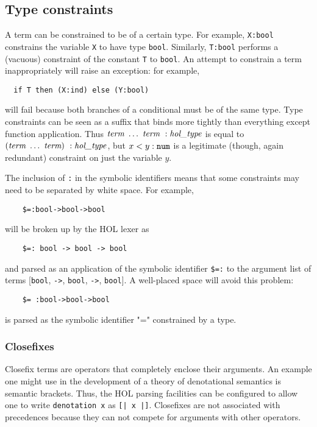 {\subsection{Type constraints}

A term can be constrained to be of a certain type.  For example,
\verb+X:bool+ constrains the variable \verb+X+ to have type
\verb+bool+. Similarly, \verb+T:bool+ performs a (vacuous) constraint
of the constant \verb+T+ to \verb+bool+. An attempt to constrain a
term inappropriately will raise an exception: for example,
\begin{verbatim}
  if T then (X:ind) else (Y:bool)
\end{verbatim}
will fail because both branches of a conditional must be of the same
type.  Type constraints can be seen as a suffix that binds more
tightly than everything except function application.  Thus $\mbox{\it term}\
\ldots\ \mbox{\it term} \ : \mbox{\it hol\_type}$ is equal to $(\mbox{\it term}\ \ldots\ \mbox{\it term})\ :
\mbox{\it hol\_type}$, but $x < y:\mbox{\tt num}$ is a legitimate (though, again
redundant) constraint on just the variable $y$.

The inclusion of \verb+:+ in the symbolic identifiers means that some
constraints may need to be separated by white space. For example,
\begin{verbatim}
    $=:bool->bool->bool
\end{verbatim}
will be broken up by the HOL lexer as
\begin{verbatim}
    $=: bool -> bool -> bool
\end{verbatim}
and parsed as an application of the symbolic identifier \verb+$=:+ to
the argument list of terms [\verb+bool+, \verb+->+, \verb+bool+,
\verb+->+, \verb+bool+]. A well-placed space will avoid this problem:
\begin{verbatim}
    $= :bool->bool->bool
\end{verbatim}
is parsed as the symbolic identifier "=" constrained by a type.

\subsubsection{Closefixes}

Closefix terms are operators that completely enclose their arguments.
An example one might use in the development of a theory of
denotational semantics is semantic brackets.  Thus, the HOL parsing
facilities can be configured to allow one to write \texttt{denotation x}
as \texttt{[| x |]}.  Closefixes are not associated with precedences
because they can not compete for arguments with other operators.

}
